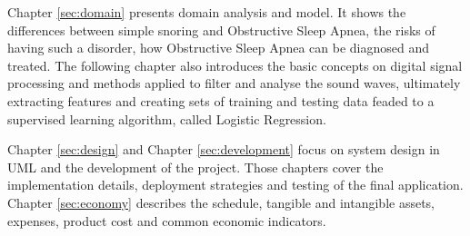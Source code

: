 Chapter \ref{sec:domain} presents domain analysis and model. It shows the differences between simple snoring and Obstructive Sleep Apnea, the risks of having such a disorder, how Obstructive Sleep Apnea can be diagnosed and treated. The following chapter also introduces the basic concepts on digital signal processing and methods applied to filter and analyse the sound waves, ultimately extracting features and creating sets of training and testing data feaded to a supervised learning algorithm, called Logistic Regression.

Chapter \ref{sec:design} and Chapter \ref{sec:development} focus on system design in UML and the development of the project. Those chapters cover the implementation details, deployment strategies and testing of the final application. Chapter \ref{sec:economy} describes the schedule, tangible and intangible assets, expenses, product cost and common economic indicators.

\clearpage